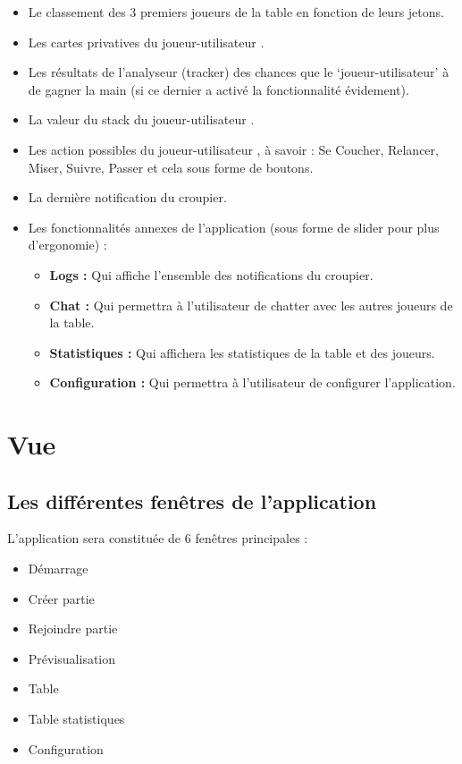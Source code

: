 \begin{enumerate}
\begin{itemize}
			\item Le classement des 3 premiers joueurs de la table en fonction 
			      de leurs jetons.
			\item Les cartes privatives du \og joueur-utilisateur \fg. 
			\item Les résultats de l'analyseur (tracker) des chances que le 
			      `joueur-utilisateur' à de gagner la main (si ce dernier a 
			       activé la fonctionnalité évidement).
			\item La valeur du stack du \og joueur-utilisateur \fg.
			\item Les action possibles du \og joueur-utilisateur \fg, à savoir : 
			      Se Coucher, Relancer, Miser, Suivre, Passer et cela sous 
			      forme de boutons.
			\item La dernière notification du croupier.
			\item Les fonctionnalités annexes de l'application 
			      (sous forme de slider pour plus d'ergonomie) : 
			
			\begin{itemize}
				\item \textbf{Logs :} Qui affiche l'ensemble des notifications 
				      du croupier.
				\item \textbf{Chat :} Qui permettra à l'utilisateur de chatter 
				      avec les autres joueurs de la table.
				\item \textbf{Statistiques :} Qui affichera les statistiques de 
				      la table et des joueurs.
				\item \textbf{Configuration :} Qui permettra à l'utilisateur de 
				      configurer l'application.
				\end{itemize} 
				
			\end{itemize}
			
		\end{enumerate}

\section{Vue}

\subsection{Les différentes fenêtres de l'application}

L'application sera constituée de 6 fenêtres principales :

\begin{itemize}
	\item Démarrage
	\item Créer partie
	\item Rejoindre partie
	\item Prévisualisation
	\item Table
	\item Table statistiques
	\item Configuration\\
\end{itemize}

